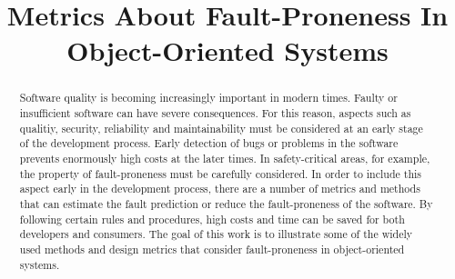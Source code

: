 \documentclass[conference]{IEEEtran}
\begin{document}
\title{Metrics About Fault-Proneness In Object-Oriented Systems}

\author{
}

% 

\maketitle

\begin{abstract}
	Software quality is becoming increasingly important in modern times. Faulty or insufficient software can have severe consequences. For this reason, aspects such as qualitiy, security, reliability and maintainability must be considered at an early stage of the development process. Early detection of bugs or problems in the software prevents enormously high costs at the later times. In safety-critical areas, for example, the property of fault-proneness must be carefully considered. In order to include this aspect early in the development process, there are a number of metrics and methods that can estimate the fault prediction or reduce the fault-proneness of the software. By following certain rules and procedures, high costs and time can be saved for both developers and consumers.
	The goal of this work is to illustrate some of the widely used methods and design metrics that consider fault-proneness in object-oriented systems.
	
\end{abstract}









%



\end{document}
